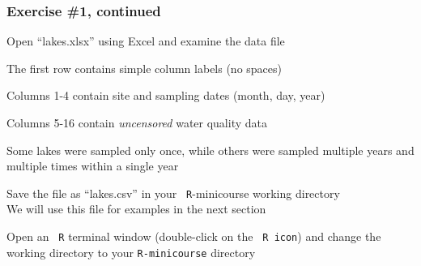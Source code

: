 \documentclass[10pt]{beamer}
\begin{document}
\begin{frame}
\frametitle{Exercise \#1, continued}
\bi
\item Open ``lakes.xlsx'' using Excel and examine the data file
   \bi
{\small
   \item The first row contains simple column labels (no spaces)
   \item Columns 1-4 contain site and sampling dates (month, day,
     year)
   \item Columns 5-16 contain {\em uncensored} water
     quality data
   \item Some lakes were sampled only once, while others were sampled
     multiple years and multiple times within a single year
}   \ei
\item Save the file as ``lakes.csv'' in your {\color{red} {\tt
    R}-minicourse} working directory\\ We will use this file for
  examples in the next section

\item Open an {\tt \color{red} R} terminal window (double-click on the
  {\tt \color{red} R icon}) and change the working directory to your
  {\color{red} \tt R-minicourse} directory

\ei
\end{frame}
\end{document}
